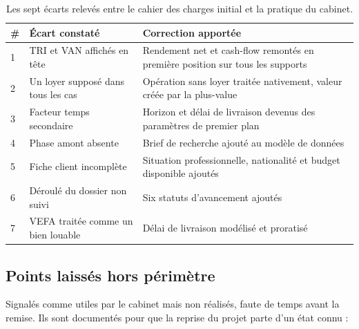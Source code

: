 \documentclass[12pt,a4paper]{article}
\begin{document}
\begin{table}[H]
	\centering
	\small
	\renewcommand{\arraystretch}{1.40}
	\begin{tabular}{|>{\centering\arraybackslash}p{0.7cm}|>{\raggedright\arraybackslash}p{6.8cm}|>{\raggedright\arraybackslash}p{6.8cm}|}
		\hline
		\rowcolor{eccblue!15}
		\textbf{\color{eccblue}\#} & \textbf{\color{eccblue}Écart constaté} &
		\textbf{\color{eccblue}Correction apportée} \\
		\hline
		\rowcolor{white}
		1 & TRI et VAN affichés en tête & Rendement net et cash-flow remontés en
		première position sur tous les supports \\
		\hline
		\rowcolor{gray!8}
		2 & Un loyer supposé dans tous les cas & Opération sans loyer traitée
		nativement, valeur créée par la plus-value \\
		\hline
		\rowcolor{white}
		3 & Facteur temps secondaire & Horizon et délai de livraison devenus des
		paramètres de premier plan \\
		\hline
		\rowcolor{gray!8}
		4 & Phase amont absente & Brief de recherche ajouté au modèle de données \\
		\hline
		\rowcolor{white}
		5 & Fiche client incomplète & Situation professionnelle, nationalité et
		budget disponible ajoutés \\
		\hline
		\rowcolor{gray!8}
		6 & Déroulé du dossier non suivi & Six statuts d'avancement ajoutés \\
		\hline
		\rowcolor{white}
		7 & VEFA traitée comme un bien louable & Délai de livraison modélisé et
		proratisé \\
		\hline
	\end{tabular}
	\caption{Les sept écarts relevés entre le cahier des charges initial et la
		pratique du cabinet.}
\end{table}

\subsection{Points laissés hors périmètre}

Signalés comme utiles par le cabinet mais non réalisés, faute de temps avant la
remise. Ils sont documentés pour que la reprise du projet parte d'un état connu :
\end{document}
